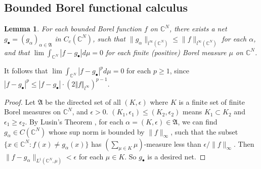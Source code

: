\documentclass[12pt,b5paper,notitlepage]{article}
\theoremstyle{definition}
\newtheorem{df}{Definition}[section]
\theoremstyle{plain}
\newtheorem{lm}[df]{Lemma}
\newcommand{\fk}{\mathfrak}
\newcommand{\mc}{\mathcal}
\newcommand{\blt}{\bullet}
\newcommand{\Cbb}{\mathbb C}
\numberwithin{equation}{section}
\begin{document}

\subsection*{Bounded Borel functional calculus}


\begin{lm}\label{lb18}
For each bounded Borel function $f$ on $\Cbb^N$, there exists a net $g_\blt=(g_\alpha)_{\alpha\in\fk A}$ in $C_c(\Cbb^N)$, such that $\lVert g_\alpha\lVert_{l^\infty(\Cbb^N)}\leq \lVert f\lVert_{l^\infty(\Cbb^N)}$ for each $\alpha$, and that $\lim \int_{\Cbb^N}|f-g_\blt|d\mu=0$ for each finite (positive) Borel measure $\mu$ on $\Cbb^N$.
\end{lm}

It follows that $\lim\int_{\Cbb^N}|f-g_\blt|^pd\mu=0$ for each $p\geq1$, since $|f-g_\blt|^p\leq |f-g_\blt|\cdot(2\Vert f\Vert_{l^\infty})^{p-1}$.

\begin{proof}
Let $\fk A$ be the directed set of all $(K,\epsilon)$ where $K$ is a finite set of finite Borel measures on $\Cbb^N$, and $\epsilon>0$.  $(K_1,\epsilon_1)\leq (K_2,\epsilon_2)$ means $K_1\subset K_2$ and $\epsilon_1\geq\epsilon_2$. By Lusin's Theorem \cite[Thm. 2.24]{Rud-R}, for each $\alpha=(K,\epsilon)\in\fk A$, we can find $g_\alpha\in C(\Cbb^N)$ whose sup norm is bounded by $\lVert f\lVert_\infty$, such that the subset $\{x\in \Cbb^N:f(x)\neq g_\alpha(x)\}$ has $(\sum_{\mu\in K}\mu)$-measure less than $\epsilon/\lVert f\lVert_\infty$.  Then $\lVert f-g_\alpha\lVert_{L^1(\Cbb^N,\mu)}<\epsilon$ for each $\mu\in K$. So $g_\blt$ is a desired net.
\end{proof}


\end{document}
